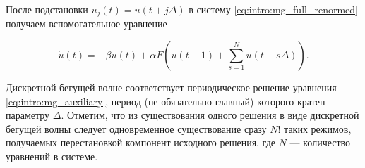 После подстановки $u_j(t) = u(t + j\Delta)$ в систему \eqref{eq:intro:mg_full_renormed} получаем вспомогательное уравнение

\begin{equation}
	\label{eq:intro:mg_auxiliary}
	\dot{u}(t) =-\beta u(t) + \alpha F\left(u(t - 1) + \sum_{s=1}^{N}u(t-s\Delta)\right).
\end{equation}

Дискретной бегущей волне соответствует периодическое решение уравнения \eqref{eq:intro:mg_auxiliary}, период (не обязательно главный) которого кратен параметру $\Delta$. Отметим, что из существования одного решения в виде дискретной бегущей волны следует одновременное существование сразу $N!$ таких режимов, получаемых перестановкой компонент исходного решения, где $N$ --- количество уравнений в системе.


%
%
%
%

